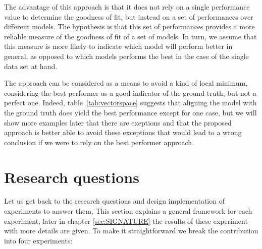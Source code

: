 The advantage of this approach is that it does not rely on a single performance value to determine the goodness of fit, but instead on a set of performances over different models.  The hypothesis is that this set of performances provides a more reliable measure of the goodness of fit of a set of models.  In turn, we assume that this measure is more likely to indicate which model will perform better in general, as opposed to which models performs the best in the case of the single data set at hand.

The approach can be considered as a means to avoid a kind of local minimum, considering the best performer as a good indicator of the ground truth, but not a perfect one. Indeed, table~\ref{tab:vectorspace} suggests that aligning the model with the ground truth does yield the best performance except for one case, but we will show more examples later that there are exeptions and that the proposed approach is better able to avoid these exceptions that would lead to a wrong conclusion if we were to rely on the best performer approach.

\section{Research questions}

Let us get back to the research questions and design implementation of experiments to answer them, This section explains a general framework for each experiment, later in chapter \ref{sec:SIGNATURE} the results of these experiment with more details are given. To make it straightforward we break the contribution into four experiments:

